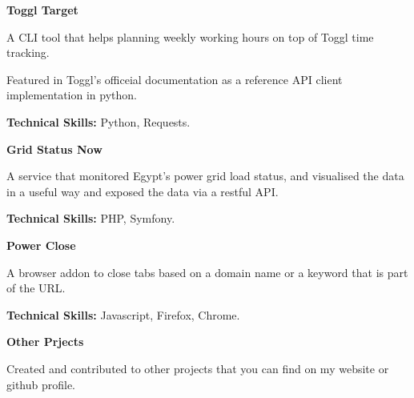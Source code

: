 

\begin{cventries}

  \cventry
    {\textbf{Toggl Target}} %
    {} %
    {} %
    {} %
    {
      \begin{cvitems} %
        \item {A CLI tool that helps planning weekly working hours on top of Toggl time tracking.} 
        \item {Featured in Toggl's officeial documentation as a reference API client implementation in python.}
        \item {\textbf{Technical Skills:} Python, Requests.}
      \end{cvitems}
    }


  \cventry
    {\textbf{Grid Status Now}} %
    {} %
    {} %
    {} %
    {
      \begin{cvitems} %
        \item {A service that monitored Egypt’s power grid load status, and visualised the data in a useful way and exposed the data via a restful API.}
        \item {\textbf{Technical Skills:} PHP, Symfony.}
      \end{cvitems}
    }

  \cventry
    {\textbf{Power Close}} %
    {} %
    {} %
    {} %
    {
      \begin{cvitems} %
        \item {A browser addon to close tabs based on a domain name or a keyword that is part of the URL.}
        \item {\textbf{Technical Skills:} Javascript, Firefox, Chrome.}
      \end{cvitems}
    }

  \cventry
    {\textbf{Other Prjects}} %
    {} %
    {} %
    {} %
    {
      \begin{cvitems} %
        \item {Created and contributed to other projects that you can find on my website or github
          profile.}
      \end{cvitems}
    }
\end{cventries}
